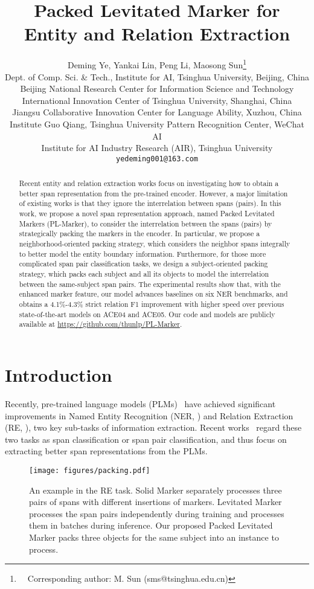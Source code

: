 \documentclass[11pt]{article}
\title{Packed Levitated Marker for  Entity and Relation Extraction}
\author{Deming Ye, Yankai Lin, Peng Li,  Maosong Sun\thanks{ \ \ Corresponding author: M. Sun (sms@tsinghua.edu.cn)} \\
Dept. of Comp. Sci. \& Tech., Institute for AI, Tsinghua University, Beijing, China \\
Beijing National Research Center for Information Science and Technology \\
International Innovation Center of Tsinghua University, Shanghai, China \\
Jiangsu Collaborative Innovation Center for Language Ability, Xuzhou, China \\
Institute Guo Qiang, Tsinghua University Pattern Recognition Center, WeChat AI \\
Institute for AI Industry Research (AIR), Tsinghua University\\
\texttt{yedeming001@163.com}
}
\newcommand\Ourmodel{PL-Marker\xspace}
\begin{document}
\maketitle

\begin{abstract}

Recent entity and relation extraction works focus on investigating how to obtain a better span representation from the pre-trained encoder. However, a major limitation of existing works is that they ignore the interrelation between spans (pairs). In this work, we propose a novel span representation approach, named Packed Levitated Markers (\Ourmodel),  to consider the interrelation between the spans (pairs) by strategically packing the markers in the encoder. In particular, we propose a neighborhood-oriented packing strategy, which  considers the neighbor spans integrally to better model the entity boundary information. 
Furthermore, for those more complicated span pair classification tasks, we  design a subject-oriented packing strategy, which packs each subject and all its objects to model the interrelation between the same-subject span pairs. 
The experimental results show that, with the enhanced marker feature, our model advances baselines on six NER benchmarks, and obtains a 4.1\%-4.3\% strict relation F1 improvement with higher speed over previous state-of-the-art models on ACE04 and ACE05. 
Our code and models are publicly available at \url{https://github.com/thunlp/PL-Marker}.


\end{abstract}




\section{Introduction}



Recently, pre-trained language models (PLMs)~\cite{BERT, RoBERTa} have achieved significant improvements in Named Entity Recognition (NER, \citet{seqner, spanner2}) and Relation Extraction (RE, \citet{DyGIEpp, Typemarker}), two key sub-tasks of information extraction.
Recent works~\cite{AutomatedConcatNER, PURE} regard these two tasks as span classification or span pair classification, and thus focus on extracting better span representations from the PLMs. 





\begin{figure}[!t]
    \centering
    \texttt{[image: figures/packing.pdf]}
    \caption{
    An example in the RE task. Solid Marker separately processes three pairs of  spans with different insertions of markers. Levitated Marker  processes the span pairs independently during training and  processes them in batches during inference.  Our proposed Packed Levitated Marker packs three objects for the same subject into an instance to process.
    }
    \label{fig:packing}
\end{figure}
\end{document}
